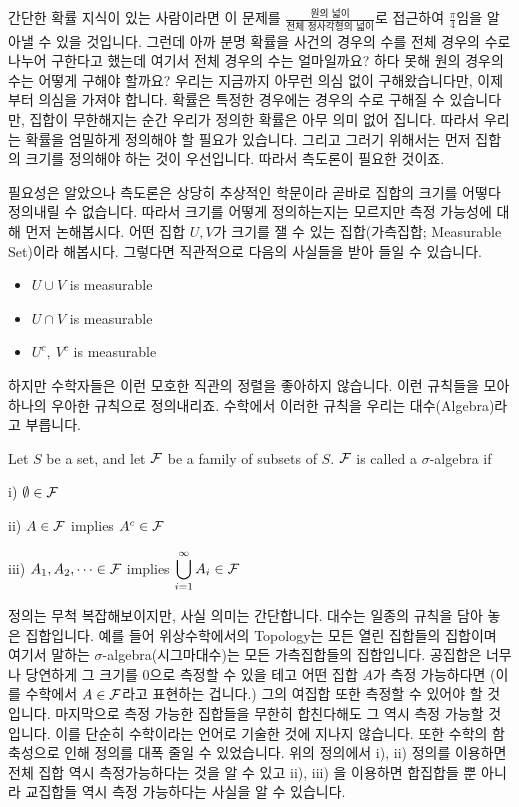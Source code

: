 \documentclass[final]{IEEEphot}
\begin{document}
간단한 확률 지식이 있는 사람이라면 이 문제를 $\frac{\text{원의 넓이}}{\text{전체 정사각형의 넓이}}$로 접근하여 $\frac{\pi}{4}$임을 알아낼 수 있을 것입니다. 그런데 아까 분명 확률을 사건의 경우의 수를 전체 경우의 수로 나누어 구한다고 했는데 여기서 전체 경우의 수는 얼마일까요? 하다 못해 원의 경우의 수는 어떻게 구해야 할까요? 우리는 지금까지 아무런 의심 없이 구해왔습니다만, 이제부터 의심을 가져야 합니다. 확률은 특정한 경우에는 경우의 수로 구해질 수 있습니다만, 집합이 무한해지는 순간 우리가 정의한 확률은 아무 의미 없어 집니다. 따라서 우리는 확률을 엄밀하게 정의해야 할 필요가 있습니다. 그리고 그러기 위해서는 먼저 집합의 크기를 정의해야 하는 것이 우선입니다. 따라서 측도론이 필요한 것이죠.


\HS 필요성은 알았으나 측도론은 상당히 추상적인 학문이라 곧바로 집합의 크기를 어떻다 정의내릴 수 없습니다. 따라서 크기를 어떻게 정의하는지는 모르지만 측정 가능성에 대해 먼저 논해봅시다. 어떤 집합 $U, V$가 크기를 잴 수 있는 집합(가측집합; Measurable Set)이라 해봅시다. 그렇다면 직관적으로 다음의 사실들을 받아 들일 수 있습니다.

\begin{itemize}
 \item $U\cup V$ is measurable
 \item $U\cap V$ is measurable
 \item $U^c,~ V^c$ is measurable
\end{itemize}

하지만 수학자들은 이런 모호한 직관의 정렬을 좋아하지 않습니다. 이런 규칙들을 모아 하나의 우아한 규칙으로 정의내리죠. 수학에서 이러한 규칙을 우리는 대수(Algebra)라고 부릅니다. 

\newpage

\begin{definition}
 Let $S$ be a set, and let $\mathcal{F}$ be a family of subsets of $S$. $\mathcal{F}$ is called a $\sigma$-algebra if
 
 i) $\emptyset \in \mathcal{F}$
 
 ii) $A\in\mathcal{F}$ implies $A^c \in \mathcal{F}$

 iii) $A_1,A_2,\cdots \in \mathcal{F}$ implies $\displaystyle \bigcup_{i=1}^{\infty} A_i \in \mathcal{F}$

 \HL
 \end{definition}

 정의는 무척 복잡해보이지만, 사실 의미는 간단합니다.  대수는 일종의 규칙을 담아 놓은 집합입니다. 예를 들어 위상수학에서의 Topology는 모든 열린 집합들의 집합이며 여기서 말하는 $\sigma$-algebra(시그마대수)는 모든 가측집합들의 집합입니다. 공집합은 너무나 당연하게 그 크기를 0으로 측정할 수 있을 테고 어떤 집합 $A$가 측정 가능하다면 (이를 수학에서 $A\in \mathcal{F}$라고 표현하는 겁니다.) 그의 여집합 또한 측정할 수 있어야 할 것입니다. 마지막으로 측정 가능한 집합들을 무한히 합친다해도 그 역시 측정 가능할 것 입니다. 이를 단순히 수학이라는 언어로 기술한 것에 지나지 않습니다. 또한 수학의 함축성으로 인해 정의를 대폭 줄일 수 있었습니다.  위의 정의에서 i), ii) 정의를 이용하면 전체 집합 역시 측정가능하다는 것을 알 수 있고 ii), iii) 을 이용하면 합집합들 뿐 아니라 교집합들 역시 측정 가능하다는 사실을 알 수 있습니다. 
 
\end{document}
